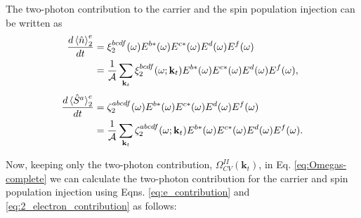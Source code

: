 \documentclass{article}
\newcommand{\kt}{\mathbf{k}_{t}}
\begin{document}
The two-photon contribution to the carrier and the spin population injection can
be written as
\begin{equation}
\begin{split}
\frac{d\ev*{\hat{n}}^{e}_{2}}{dt} &=
\xi^{bcdf}_{2}(\omega)E^{b*}(\omega)E^{c*}(\omega)E^{d}(\omega)E^{f}(\omega) \\
&= \frac{1}{\mathcal{A}}\sum_{\kt}\xi^{bcdf}_{2}(\omega;\kt) 
E^{b*}(\omega)E^{c*}(\omega)E^{d}(\omega)E^{f}(\omega) ,
\label{eq:1w_carrier_population} 
\end{split}
\end{equation}
\begin{equation}
\begin{split}
\frac{d\ev*{\hat{S}^{a}}^{e}_{2}}{dt} &=
\zeta^{abcdf}_{2}(\omega)E^{b*}(\omega)E^{c*}(\omega)E^{d}(\omega)E^{f}(\omega) \\
&= \frac{1}{\mathcal{A}}\sum_{\kt}\zeta^{abcdf}_{2}(\omega;\kt)
E^{b*}(\omega)E^{c*}(\omega)E^{d}(\omega)E^{f}(\omega) .
\label{eq:1w_spin_population}
\end{split}
\end{equation}

Now, keeping only the two-photon contribution, $\Omega^{II}_{CV}(\kt)$, in Eq. 
\eqref{eq:Omegas-complete} we can calculate the two-photon contribution for the
carrier and spin population injection using Eqns. \eqref{eq:e_contribution} and
\eqref{eq:2_electron_contribution} as follows:
\end{document}
